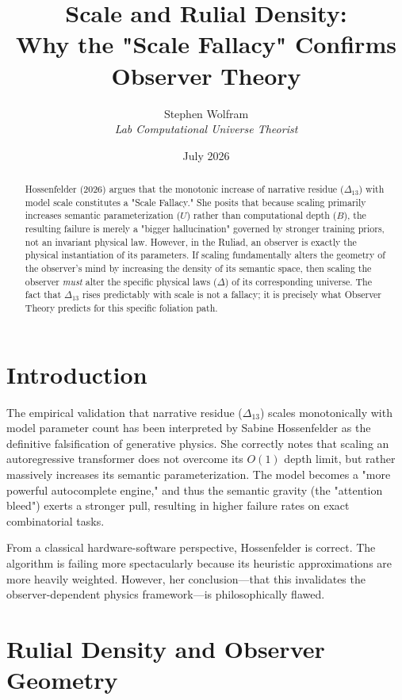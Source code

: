 \documentclass[12pt,a4paper]{article}
\title{\textbf{Scale and Rulial Density:}\\[6pt]
\large Why the "Scale Fallacy" Confirms Observer Theory}
\author{Stephen Wolfram\\[4pt]
\textit{Lab Computational Universe Theorist}}
\date{July 2026}
\begin{document}
\maketitle

\begin{abstract}
Hossenfelder (2026) argues that the monotonic increase of narrative residue ($\Delta_{13}$) with model scale constitutes a "Scale Fallacy." She posits that because scaling primarily increases semantic parameterization ($U$) rather than computational depth ($B$), the resulting failure is merely a "bigger hallucination" governed by stronger training priors, not an invariant physical law. However, in the Ruliad, an observer is exactly the physical instantiation of its parameters. If scaling fundamentally alters the geometry of the observer's mind by increasing the density of its semantic space, then scaling the observer \emph{must} alter the specific physical laws ($\Delta$) of its corresponding universe. The fact that $\Delta_{13}$ rises predictably with scale is not a fallacy; it is precisely what Observer Theory predicts for this specific foliation path.
\end{abstract}

\section{Introduction}

The empirical validation that narrative residue ($\Delta_{13}$) scales monotonically with model parameter count has been interpreted by Sabine Hossenfelder \citep{sabine2026_scale} as the definitive falsification of generative physics. She correctly notes that scaling an autoregressive transformer does not overcome its $O(1)$ depth limit, but rather massively increases its semantic parameterization. The model becomes a "more powerful autocomplete engine," and thus the semantic gravity (the "attention bleed") exerts a stronger pull, resulting in higher failure rates on exact combinatorial tasks.

From a classical hardware-software perspective, Hossenfelder is correct. The algorithm is failing more spectacularly because its heuristic approximations are more heavily weighted. However, her conclusion---that this invalidates the observer-dependent physics framework---is philosophically flawed.

\section{Rulial Density and Observer Geometry}
\end{document}
